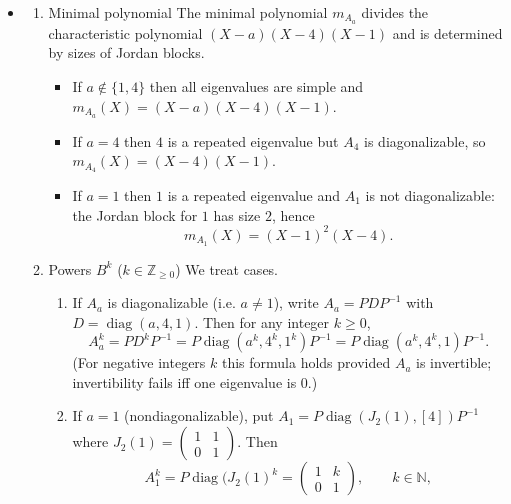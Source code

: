 \documentclass[12pt]{article}
\begin{document}
\begin{answerbox}
\begin{itemize}
\begin{enumerate}
                
                If $a=1$, the eigenvalue $1$ has algebraic multiplicity $2$ but geometric multiplicity $1$ (since $\operatorname{rank}(A_1-I)=2$), so $A_1$ is \emph{not} diagonalizable.
                Therefore $A_a$ is diagonalizable for every real $a$ except $a=1$.
        \end{enumerate}
    \item 
        \begin{enumerate}
            \item Minimal polynomial
                The minimal polynomial $m_{A_a}$ divides the characteristic polynomial $(X-a)(X-4)(X-1)$ and is determined by sizes of Jordan blocks.
                \begin{itemize}
                    \item If $a\notin\{1,4\}$ then all eigenvalues are simple and $m_{A_a}(X)=(X-a)(X-4)(X-1)$.
                    \item If $a=4$ then $4$ is a repeated eigenvalue but $A_4$ is diagonalizable, so $m_{A_4}(X)=(X-4)(X-1)$.
                    \item If $a=1$ then $1$ is a repeated eigenvalue and $A_1$ is not diagonalizable: the Jordan block for $1$ has size $2$, hence
                    \[m_{A_1}(X)=(X-1)^2(X-4).\]
                \end{itemize}
            \item Powers $B^k$ ($k\in\mathbb{Z}_{\ge0}$)
                We treat cases.
                \begin{enumerate}
                    \item If $A_a$ is diagonalizable (i.e. $a\neq1$), write $A_a=PDP^{-1}$ with $D=\operatorname{diag}(a,4,1)$. Then for any integer $k\ge0$,
                    \[A_a^k=PD^kP^{-1}=P\operatorname{diag}(a^k,4^k,1^k)P^{-1}=P\operatorname{diag}(a^k,4^k,1)P^{-1}.\]
                    (For negative integers $k$ this formula holds provided $A_a$ is invertible; invertibility fails iff one eigenvalue is $0$.)
                    \item If $a=1$ (non\-diagonalizable), put $A_1=P\operatorname{diag}(J_2(1),[4])P^{-1}$ where $J_2(1)=\begin{pmatrix}1&1\\0&1\end{pmatrix}$. Then
                    \[A_1^k=P\operatorname{diag}(J_2(1)^k=\begin{pmatrix}1 & k\\0 & 1\end{pmatrix},\qquad k\in\mathbb{N},\]

\end{enumerate}
\end{enumerate}
\end{itemize}
\end{answerbox}
\end{document}
